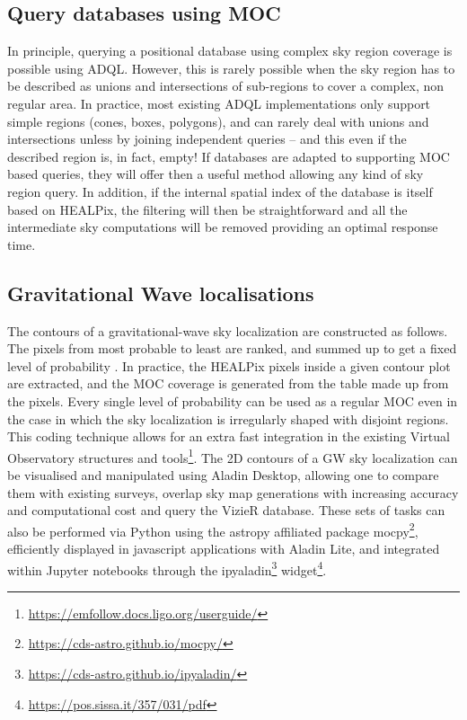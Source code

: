 \documentclass[11pt,a4paper]{ivoa}
\begin{document}
\subsection{Query databases using MOC}
In principle, querying a positional database using complex sky region
coverage is possible using ADQL. However, this is rarely possible
when the sky region has to be described as unions and intersections of
sub-regions to cover a complex, non regular area. In practice, most
existing ADQL implementations only support simple regions
(cones, boxes, polygons), and can rarely deal with unions and
intersections unless by joining independent queries – and this even if
the described region is, in fact, empty!  If databases are adapted to
supporting MOC based queries, they will offer then a useful method
allowing any kind of sky region query. In addition, if the internal
spatial index of the database is itself based on HEALPix, the
filtering will then be straightforward and all the intermediate sky
computations will be removed providing an optimal response time.

\subsection{Gravitational Wave localisations}
The contours of a gravitational-wave sky localization are constructed
as follows. The pixels from most probable to least are ranked, and summed
up to get a fixed level of probability \citep{2014ApJ...795..105S}.
In practice, the HEALPix pixels inside a given contour plot are extracted,
and the MOC coverage is generated from the table made up from the pixels.
Every single level of probability can be used as a regular MOC even in the case in
which the sky localization is irregularly shaped with disjoint regions.
This coding technique allows for an extra fast integration in the existing
Virtual Observatory structures and
tools\footnote{\url{https://emfollow.docs.ligo.org/userguide/}}.
The 2D contours of a GW sky localization can be visualised
and manipulated using Aladin Desktop, allowing one to compare them with
existing surveys, overlap sky map generations with increasing accuracy
and computational cost and query the VizieR database.
These sets of tasks can also be performed via Python using the astropy
affiliated package mocpy\footnote{\url{https://cds-astro.github.io/mocpy/}},
efficiently displayed in javascript applications
with Aladin Lite, and integrated within Jupyter notebooks through the
ipyaladin\footnote{\url{https://cds-astro.github.io/ipyaladin/}}
widget\footnote{\url{https://pos.sissa.it/357/031/pdf}}.
\end{document}
